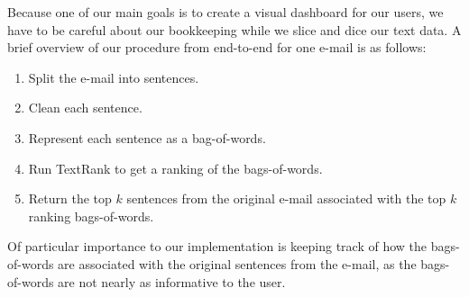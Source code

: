 Because one of our main goals is to create a visual dashboard for our users, we have to be careful about our bookkeeping while we slice and dice our text data. 
A brief overview of our procedure from end-to-end for one e-mail is as follows:
\begin{enumerate}
\item Split the e-mail into sentences.
\item Clean each sentence.
\item Represent each sentence as a bag-of-words.
\item Run TextRank to get a ranking of the bags-of-words.
\item Return the top $k$ sentences from the original e-mail associated with the top $k$ ranking bags-of-words.
\end{enumerate}

Of particular importance to our implementation is keeping track of how the bags-of-words are associated with the original sentences from the e-mail, as the bags-of-words are not nearly as informative to the user.